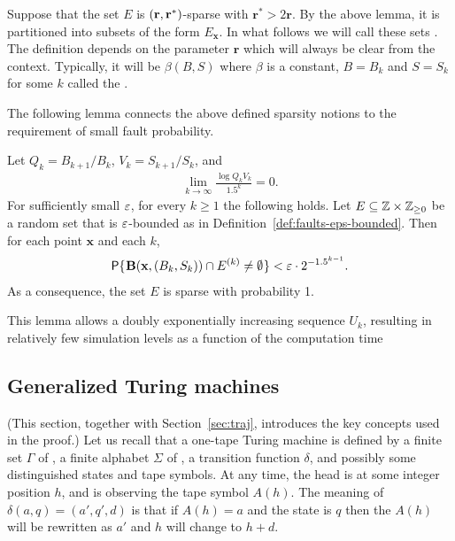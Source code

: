 \documentclass[11pt]{memoir}
\theoremstyle{definition} %
\renewcommand{\ge}{\geq}
\renewcommand{\vek}[1]{\mathbf{#1}}
\def\B{B}
\def\U{U}
\def\V{V}
\newcommand{\h}{h} %
\newcommand{\Q}{Q} %
\renewcommand{\S}{S} %
\renewcommand{\r}{\vek{r}} %
\newcommand{\x}{\vek{x}} %
\begin{document}
\begin{definition}[Burst]\label{def:burst}
  Suppose that the set \( E \) is \( \pair{\r}{\r^{*}} \)-sparse with \( \r^{*}>2\r \).
  By the above lemma, it is partitioned into subsets of the form \( E_{\x} \).
  In what follows we will call these sets .
  The definition depends on the parameter \( \r \) which will always be
  clear from the context.
  Typically, it will be \( \beta(\B,\S) \) where \( \beta \) is a constant,
  \( \B=\B_{k} \) and \( \S=\S_{k} \) for some \( k \) called the .
\end{definition}

The following lemma connects the above defined sparsity notions to the requirement
of small fault probability.

\begin{lemma}[Sparsity]\label{lem:sparsity}
Let \( \Q_{k} = \B_{k+1}/\B_{k} \),  \( \V_{k} = \S_{k+1}/\S_{k} \), and
\begin{align}\label{eq:growth-assumption}
  \lim_{k\rightarrow\infty}\frac{\log \Q_{k}\V_{k}}{1.5^k}=0.
\end{align}
For sufficiently small \( \varepsilon \), for every \( k\ge 1 \) the following holds.
Let \( E\subseteq \bbZ\times\bbZ_{\ge 0} \) 
be a random set that is \( \varepsilon \)-bounded as in Definition~\ref{def:faults-eps-bounded}.
Then for each point \( \x \)  and each \( k \),
 \begin{align*}
   \Pbof{\bB(\x,\pair{\B_{k}}{\S_{k}})\cap E^{(k)}\neq\emptyset} < \eps \cdot 2^{-1.5^{k-1}}.
 \end{align*}
As a consequence, the set \( E \) is sparse with probability 1.
\end{lemma}

This lemma allows a doubly exponentially increasing sequence \( \U_{k} \), resulting
in relatively few simulation levels as a function of the computation time





\subsection{Generalized Turing machines}\label{sec:TM}

(This section, together with Section~\ref{sec:traj},
introduces the key concepts used in the proof.)
Let us recall that a one-tape Turing machine is defined by a
finite set \( \Gamma \) of ,
a finite alphabet \( \Sigma \) of , a transition function \( \delta \),
and possibly some distinguished states and tape symbols.
At any time, the head is at some integer position \( \h \), and is observing the tape
symbol \( A(\h) \).
The meaning of \( \delta(a,q)=(a',q',d) \) is that if \( A(\h)=a \) and the state is \( q \) then
the \( A(\h) \) will be rewritten as \( a' \) and \( \h \) will change to \( \h+d \).
\end{document}
